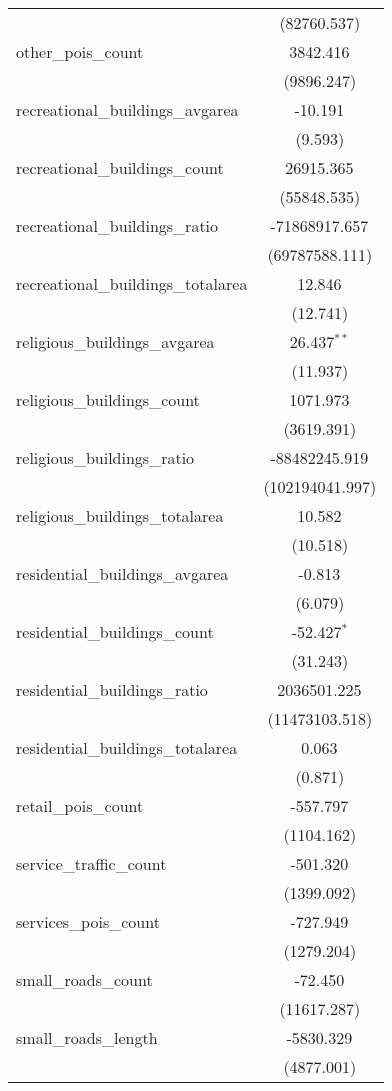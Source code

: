 \begin{table}[!htbp]
\begin{tabular}{@{\extracolsep{5pt}}lc}
  & (82760.537) \\
 other_pois_count & 3842.416$^{}$ \\
  & (9896.247) \\
 recreational_buildings_avgarea & -10.191$^{}$ \\
  & (9.593) \\
 recreational_buildings_count & 26915.365$^{}$ \\
  & (55848.535) \\
 recreational_buildings_ratio & -71868917.657$^{}$ \\
  & (69787588.111) \\
 recreational_buildings_totalarea & 12.846$^{}$ \\
  & (12.741) \\
 religious_buildings_avgarea & 26.437$^{**}$ \\
  & (11.937) \\
 religious_buildings_count & 1071.973$^{}$ \\
  & (3619.391) \\
 religious_buildings_ratio & -88482245.919$^{}$ \\
  & (102194041.997) \\
 religious_buildings_totalarea & 10.582$^{}$ \\
  & (10.518) \\
 residential_buildings_avgarea & -0.813$^{}$ \\
  & (6.079) \\
 residential_buildings_count & -52.427$^{*}$ \\
  & (31.243) \\
 residential_buildings_ratio & 2036501.225$^{}$ \\
  & (11473103.518) \\
 residential_buildings_totalarea & 0.063$^{}$ \\
  & (0.871) \\
 retail_pois_count & -557.797$^{}$ \\
  & (1104.162) \\
 service_traffic_count & -501.320$^{}$ \\
  & (1399.092) \\
 services_pois_count & -727.949$^{}$ \\
  & (1279.204) \\
 small_roads_count & -72.450$^{}$ \\
  & (11617.287) \\
 small_roads_length & -5830.329$^{}$ \\
  & (4877.001) \\

\end{tabular}
\end{table}
